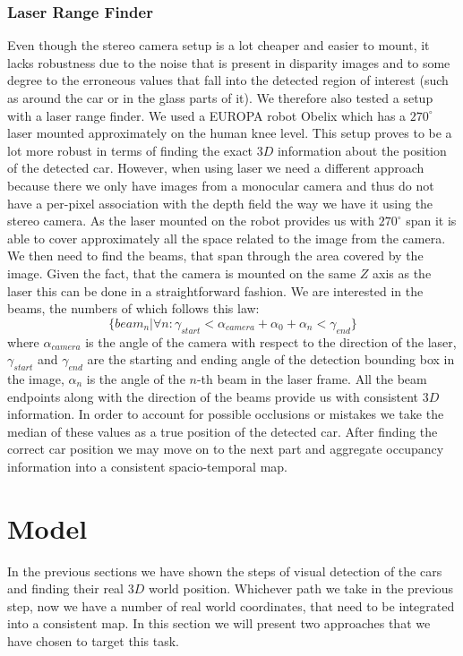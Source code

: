         \subsubsection{Laser Range Finder}\label{ssub:laser_range_finder}
            Even though the stereo camera setup is a lot cheaper and easier to mount, it lacks robustness due to the noise that is present in disparity images and to some degree to the erroneous values that fall into the detected region of interest (such as around the car or in the glass parts of it). We therefore also tested a setup with a laser range finder. We used a EUROPA robot Obelix which has a $270^\circ$ laser mounted approximately on the human knee level. This setup proves to be a lot more robust in terms of finding the exact $3D$ information about the position of the detected car.
            However, when using laser we need a different approach because there we only have images from a monocular camera and thus do not have a per-pixel association with the depth field the way we have it using the stereo camera.
            As the laser mounted on the robot provides us with $270^\circ$ span it is able to cover approximately all the space related to the image from the camera. We then need to find the beams, that span through the area covered by the image. Given the fact, that the camera is mounted on the same $Z$ axis as the laser this can be done in a straightforward fashion. We are interested in the beams, the numbers of which follows this law:
            $$ \{ beam_n | \forall n : \gamma_{start} < \alpha_{camera} + \alpha_{0} + \alpha_{n} < \gamma_{end} \}$$
            where $\alpha_{camera}$ is the angle of the camera with respect to the direction of the laser, $\gamma_{start}$ and $\gamma_{end}$ are the starting and ending angle of the detection bounding box in the image, $\alpha_{n}$ is the angle of the $n$-th beam in the laser frame.
            All the beam endpoints along with the direction of the beams provide us with consistent $3D$ information. In order to account for possible occlusions or mistakes we take the median of these values as a true position of the detected car.
            After finding the correct car position we may move on to the next part and aggregate occupancy information into a consistent spacio-temporal map.

\section{Model} %
\label{sec:model}
    In the previous sections we have shown the steps of visual detection of the cars and finding their real $3D$ world position.
    Whichever path we take in the previous step, now we have a number of real world coordinates, that need to be integrated into a consistent map. In this section we will present two approaches that we have chosen to target this task.
